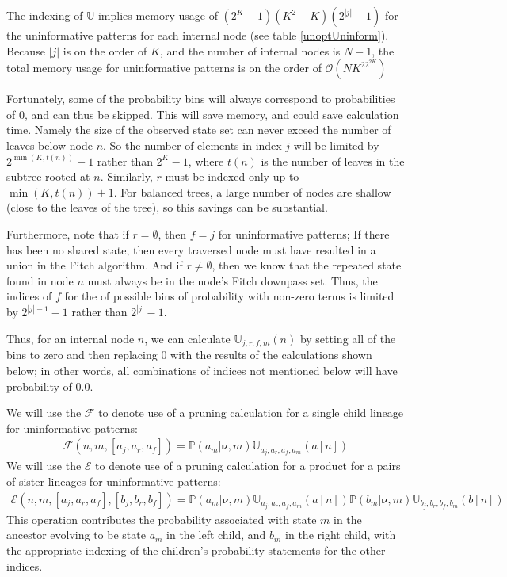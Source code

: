 \documentclass[11pt]{article}
\newcommand{\edgeLengths}{\ensuremath{\bm \nu}\xspace}
\newcommand{\patProbSym}{\ensuremath{\mathbb P}\xspace}
\renewcommand{\Pr}{\patProbSym}
\newcommand{\probUninformPatClassSym}{\ensuremath{\mathbb U}\xspace}
\newcommand{\probUninformPatClass}[5]{\ensuremath{\probUninformPatClassSym_{#1,#2,#3,#4}\left(#5\right)}\xspace}
\newcommand{\leftChild}[1]{\ensuremath{a\left[#1\right]}\xspace} %
\newcommand{\rightChild}[1]{\ensuremath{b\left[#1\right]}\xspace}%
\newcommand{\numLeaves}[1]{\ensuremath{t\left(#1\right)}\xspace}
\newcommand{\order}{{\mathcal{O}}}
\newcommand{\FelsensteinPruneSym}{{\mathcal{F}}}
\newcommand{\FelsensteinPruneUninform}[5]{\FelsensteinPruneSym(#1,#2,\left[#3,#4,#5\right])}
\newcommand{\DoubleFelsensteinPruneSym}{{\mathcal{E}}}
\newcommand{\DoubleFelsensteinPruneUninform}[8]{\DoubleFelsensteinPruneSym(#1,#2,\left[#3,#4,#5\right],\left[#6,#7,#8\right])}
\begin{document}
The indexing of $\probUninformPatClassSym$ implies memory usage of $\left(2^K-1\right)\left(K^2 + K\right)\left(2^{|j|}-1\right)$ for the uninformative patterns for each internal node (see table \ref{unoptUninform}).
Because $|j|$ is on the order of $K$, and the number of internal nodes is $N - 1$, the total memory usage for uninformative patterns is on the order of $\order\left(NK^22^{2K}\right)$

Fortunately, some of the probability bins will always correspond to probabilities of 0, and can thus be skipped. 
This will save memory, and could save calculation time.
Namely the size of the observed state set can never exceed the number of leaves below node $n$.  
So the number of elements in index $j$ will be limited by $2^{\min(K,\numLeaves{n})}-1$ rather than $2^K-1$, where $\numLeaves{n}$ is the number of leaves in the subtree rooted at $n$.
Similarly, $r$ must be indexed only up to $\min(K,\numLeaves{n}) + 1$.
For balanced trees, a large number of nodes are shallow (close to the leaves of the tree), so this savings can be substantial.

Furthermore, note that if $r=\emptyset$, then $f=j$ for uninformative patterns; If there has been no shared state, then every traversed node must have resulted in a union in the Fitch algorithm.
And if $r\neq\emptyset$, then we know that the repeated state found in node $n$ must always be in the node's Fitch downpass set.
Thus, the indices of $f$ for the of possible bins of probability with non-zero terms is limited by $2^{|j|-1}-1$ rather than $2^{|j|}-1$.

Thus, for an internal node $n$,  we can calculate \probUninformPatClass{j}{r}{f}{m}{n} by setting all of the bins to zero and then replacing 0 with the results of the calculations shown below; in other words, all combinations of indices not mentioned below will have probability of 0.0.

We will use the $\FelsensteinPruneSym$ to denote use of a pruning calculation for a single child lineage for uninformative patterns:
\begin{eqnarray}
	\FelsensteinPruneUninform{n}{m}{a_j}{a_r}{a_f} = \Pr(a_m|\edgeLengths, m)\probUninformPatClass{a_j}{a_r}{a_f}{a_m}{\leftChild{n}}
\end{eqnarray}
We will use the $\DoubleFelsensteinPruneSym$ to denote use of a pruning calculation for a product for a pairs of sister lineages for uninformative patterns:
\begin{eqnarray}
	\DoubleFelsensteinPruneUninform{n}{m}{a_j}{a_r}{a_f}{b_j}{b_r}{b_f} = \Pr(a_m|\edgeLengths, m)\probUninformPatClass{a_j}{a_r}{a_f}{a_m}{\leftChild{n}}\Pr(b_m|\edgeLengths, m)\probUninformPatClass{b_j}{b_r}{b_f}{b_m}{\rightChild{n}}
\end{eqnarray}
This operation contributes the probability associated with state $m$ in the ancestor evolving to be state $a_m$ in the left child, and $b_m$ in the right child, with the appropriate indexing of the children's probability statements for the other indices.
\end{document}
